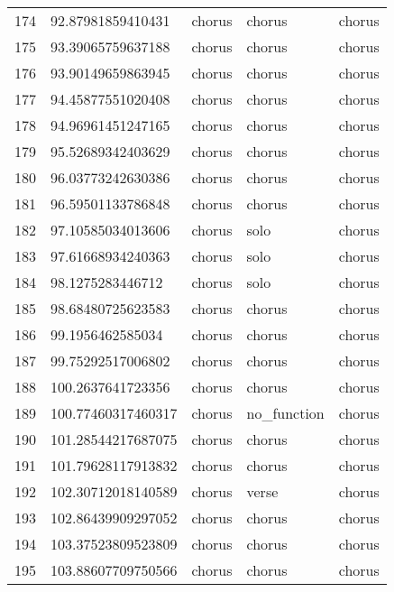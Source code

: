 \begin{table}[]
\begin{tabular}{lllll}
    174  & 92.87981859410431  & chorus       & chorus          & chorus         \\
    175  & 93.39065759637188  & chorus       & chorus          & chorus         \\
    176  & 93.90149659863945  & chorus       & chorus          & chorus         \\
    177  & 94.45877551020408  & chorus       & chorus          & chorus         \\
    178  & 94.96961451247165  & chorus       & chorus          & chorus         \\
    179  & 95.52689342403629  & chorus       & chorus          & chorus         \\
    180  & 96.03773242630386  & chorus       & chorus          & chorus         \\
    181  & 96.59501133786848  & chorus       & chorus          & chorus         \\
    182  & 97.10585034013606  & chorus       & solo            & chorus         \\
    183  & 97.61668934240363  & chorus       & solo            & chorus         \\
    184  & 98.1275283446712   & chorus       & solo            & chorus         \\
    185  & 98.68480725623583  & chorus       & chorus          & chorus         \\
    186  & 99.1956462585034   & chorus       & chorus          & chorus         \\
    187  & 99.75292517006802  & chorus       & chorus          & chorus         \\
    188  & 100.2637641723356  & chorus       & chorus          & chorus         \\
    189  & 100.77460317460317 & chorus       & no\_function    & chorus         \\
    190  & 101.28544217687075 & chorus       & chorus          & chorus         \\
    191  & 101.79628117913832 & chorus       & chorus          & chorus         \\
    192  & 102.30712018140589 & chorus       & verse           & chorus         \\
    193  & 102.86439909297052 & chorus       & chorus          & chorus         \\
    194  & 103.37523809523809 & chorus       & chorus          & chorus         \\
    195  & 103.88607709750566 & chorus       & chorus          & chorus         \\

\end{tabular}
\end{table}
